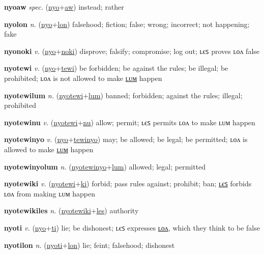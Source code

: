 \textbf{\hypertarget{nyoaw}{nyoaw}} \textit{spec.} (\hyperlink{nyo}{nyo}+\allowbreak \hyperlink{aw}{aw})
instead; rather

\textbf{\hypertarget{nyolon}{nyolon}} \textit{n.} (\hyperlink{nyo}{nyo}+\allowbreak \hyperlink{lon}{lon})
falsehood; fiction; false; wrong; incorrect; not happening; fake

\textbf{\hypertarget{nyonoki}{nyonoki}} \textit{v.} (\hyperlink{nyo}{nyo}+\allowbreak \hyperlink{noki}{noki})
disprove; falsify; compromise; log out; ʟєꜱ proves ʟᴏᴧ false

\textbf{\hypertarget{nyotewi}{nyotewi}} \textit{v.} (\hyperlink{nyo}{nyo}+\allowbreak \hyperlink{tewi}{tewi})
be forbidden; be against the rules; be illegal; be prohibited; ʟᴏᴧ is not allowed to make \hyperlink{nyotewilum}{ʟᴜᴍ} happen

\textbf{\hypertarget{nyotewilum}{nyotewilum}} \textit{n.} (\hyperlink{nyotewi}{nyotewi}+\allowbreak \hyperlink{lum}{lum})
banned; forbidden; against the rules; illegal; prohibited

\textbf{\hypertarget{nyotewinu}{nyotewinu}} \textit{v.} (\hyperlink{nyotewi}{nyotewi}+\allowbreak \hyperlink{nu}{nu})
allow; permit; ʟєꜱ permits ʟᴏᴧ to make ʟᴜᴍ happen

\textbf{\hypertarget{nyotewinyo}{nyotewinyo}} \textit{v.} (\hyperlink{nyo}{nyo}+\allowbreak \hyperlink{tewinyo}{tewinyo})
may; be allowed; be legal; be permitted; ʟᴏᴧ is allowed to make \hyperlink{nyotewinyolum}{ʟᴜᴍ} happen

\textbf{\hypertarget{nyotewinyolum}{nyotewinyolum}} \textit{n.} (\hyperlink{nyotewinyo}{nyotewinyo}+\allowbreak \hyperlink{lum}{lum})
allowed; legal; permitted

\textbf{\hypertarget{nyotewiki}{nyotewiki}} \textit{v.} (\hyperlink{nyotewi}{nyotewi}+\allowbreak \hyperlink{ki}{ki})
forbid; pass rules against; prohibit; ban; \hyperlink{nyotewikiles}{ʟєꜱ} forbids ʟᴏᴧ from making ʟᴜᴍ happen

\textbf{\hypertarget{nyotewikiles}{nyotewikiles}} \textit{n.} (\hyperlink{nyotewiki}{nyotewiki}+\allowbreak \hyperlink{les}{les})
authority

\textbf{\hypertarget{nyoti}{nyoti}} \textit{v.} (\hyperlink{nyo}{nyo}+\allowbreak \hyperlink{ti}{ti})
lie; be dishonest; ʟєꜱ expresses \hyperlink{nyotilon}{ʟᴏᴧ}, which they think to be false

\textbf{\hypertarget{nyotilon}{nyotilon}} \textit{n.} (\hyperlink{nyoti}{nyoti}+\allowbreak \hyperlink{lon}{lon})
lie; feint; falsehood; dishonest

